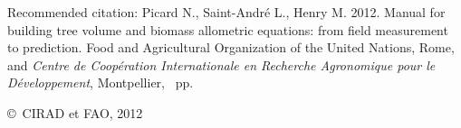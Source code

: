 {\bigskip\noindent Recommended citation: Picard N., Saint-André L., Henry M. 2012. Manual for building tree volume and biomass allometric equations: from field measurement to prediction. Food and Agricultural Organization of the United Nations, Rome, and \textit{Centre de Coopération Internationale en Recherche Agronomique pour le Développement}, Montpellier, \pageref{LastPage}~pp.}

\bigskip\noindent\copyright\ CIRAD et FAO, 2012





